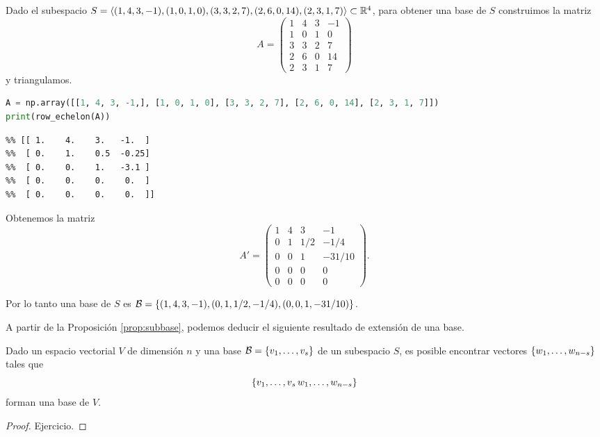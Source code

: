 \begin{ejemplo}
Dado el subespacio $S = \langle( 1,  4,  3, -1), (1,  0,  1,  0), (3,  3,  2,  7), (2,  6,  0, 14),( 2,  3,  1,  7)\rangle \subset \mathbb R^4$, para obtener una base de $S$ construimos la matriz
$$
A =
\begin{pmatrix}
 1 & 4 & 3 & -1 \\
 1 & 0 & 1 &  0 \\
 3 & 3 & 2 &  7 \\
 2 & 6 & 0 & 14 \\
 2 & 3 & 1 &  7
\end{pmatrix}
$$
y triangulamos.

\begin{Shaded}
\begin{lstlisting}[language=Python]
A = np.array([[1, 4, 3, -1,], [1, 0, 1, 0], [3, 3, 2, 7], [2, 6, 0, 14], [2, 3, 1, 7]])
print(row_echelon(A))
\end{lstlisting}
\end{Shaded}

\begin{verbatim}
%% [[ 1.    4.    3.   -1.  ]
%%  [ 0.    1.    0.5  -0.25]
%%  [ 0.    0.    1.   -3.1 ]
%%  [ 0.    0.    0.    0.  ]
%%  [ 0.    0.    0.    0.  ]]
\end{verbatim}

Obtenemos la matriz
$$
A' =
\begin{pmatrix}
 1 & 4 & 3 & -1 \\
 0 & 1 & 1/2 &  -1/4 \\
 0 & 0 & 1 &  -31/10 \\
 0 & 0 & 0 & 0 \\
 0 & 0 & 0 & 0
\end{pmatrix}.
$$

Por lo tanto una base de $S$ es $\mathcal B = \{(1, 4, 3, -1), (0, 1, 1/2, -1/4), (0, 0, 1, -31/10)\}$.
\end{ejemplo}

A partir de la Proposici\'on \ref{prop:subbase}, podemos deducir el siguiente resultado de extensión de una base.

\begin{prop}
\label{prop:extension}
Dado un espacio vectorial $V$ de dimensión $n$ y una base $\B = \{\vb_1, \dots, \vb_s\}$ de un subespacio $S$, es posible encontrar vectores $\{\wb_1, \dots, \wb_{n-s}\}$ tales que
$$
\{\vb_1, \dots, \vb_s\, \wb_1, \dots, \wb_{n-s}\}
$$
forman una base de $V$.
\end{prop}
\begin{proof} Ejercicio.
\end{proof}

